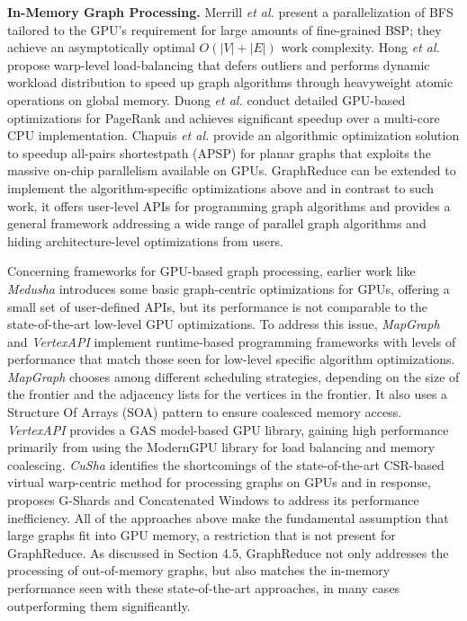 {\bf In-Memory Graph Processing.} Merrill \textit{et al.}\cite{Merrill} present 
a parallelization of BFS tailored to the GPU's requirement for large amounts of fine-grained BSP; they achieve an asymptotically 
optimal $O(|V|+|E|)$ work complexity. 
Hong \textit{et al.}\cite{Hong} propose warp-level load-balancing that defers outliers 
and performs dynamic workload distribution to speed up graph algorithms through heavyweight atomic operations on global memory. 
Duong \textit{et al.} \cite{Duong} conduct detailed GPU-based optimizations for PageRank and achieves significant speedup over 
a multi-core CPU implementation. Chapuis \textit{et al.} \cite{ASSP} provide an algorithmic optimization solution to speedup 
all-pairs shortestpath (APSP) for planar graphs that exploits the massive on-chip parallelism available on GPUs. 
GraphReduce can be extended to implement the algorithm-specific optimizations above and in contrast to such work, it offers
user-level APIs for programming graph algorithms and provides a general framework addressing a wide range of parallel graph algorithms 
and hiding architecture-level optimizations from users.

Concerning frameworks for GPU-based graph processing, earlier work like \textit{Medusha} \cite{medusa} introduces some basic
graph-centric optimizations for GPUs, offering a small set of user-defined APIs, but its performance is not comparable to the
state-of-the-art low-level GPU optimizations. To address this issue, \textit{MapGraph} \cite{mapgraph} and \textit{VertexAPI}\cite{vertexapi}
implement runtime-based programming frameworks with levels of performance that match those seen for low-level specific algorithm optimizations. 
\textit{MapGraph} chooses among different scheduling strategies, depending on the size of the frontier and the adjacency lists 
for the vertices in the frontier. 
It also uses a Structure Of Arrays (SOA) pattern to ensure coalesced memory access. 
\textit{VertexAPI} provides a GAS model-based GPU library, gaining high performance primarily from using the 
ModernGPU \cite{moderngpu} library for load balancing and memory coalescing. \textit{CuSha} \cite{cusha} identifies the shortcomings 
of the state-of-the-art CSR-based virtual warp-centric method for processing graphs on GPUs and in response, proposes G-Shards and 
Concatenated Windows to address its performance inefficiency. All of the approaches above make the fundamental assumption that 
large graphs fit into GPU memory, a restriction that is not present for GraphReduce. As discussed in Section 4.5, GraphReduce 
not only addresses the processing of out-of-memory graphs, but also matches the in-memory performance seen with these state-of-the-art 
approaches, in many cases outperforming them significantly. 

